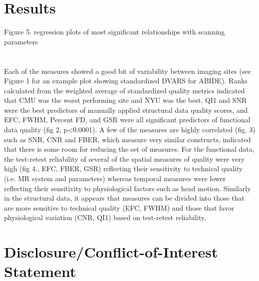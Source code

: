 \documentclass{frontiersSCNS} %
\begin{document}
\section{Results}
\label{sec:28}

Figure 5. regression plots of most significant relationships with scanning parameters \\
\\\\
Each of the measures showed a good bit of variability between imaging sites (see Figure 1 for an example plot showing standardized DVARS for ABIDE). Ranks calculated from the weighted average of standardized quality metrics indicated that CMU was the worst performing site and NYU was the best. QI1 and SNR were the best predictors of manually applied structural data quality scores, and EFC, FWHM, Percent FD, and GSR were all significant predictors of functional data quality (fig 2, p<0.0001). A few of the measures are highly correlated (fig. 3) such as SNR, CNR and FBER, which measure very similar constructs, indicated that there is some room for reducing the set of measures. For the functional data, the test­-retest reliability of several of the spatial measures of quality were very high (fig 4., EFC, FBER, GSR) reflecting their sensitivity to technical quality (i.e. MR system and parameters) whereas temporal measures were lower reflecting their sensitivity to physiological factors such as head motion. Similarly in the structural data, it appears that measures can be divided into those that are more sensitive to technical quality (EFC, FWHM) and those that favor physiological variation (CNR, QI1) based on test­-retest reliability.


\section*{Disclosure/Conflict-of-Interest Statement}
\end{document}

